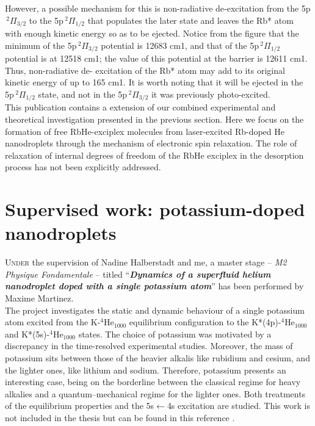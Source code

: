 		However, a possible mechanism for this is non-radiative de-excitation from the 5p$\,^2\Pi_{3/2}$ to the 5p$\,^2\Pi_{1/2}$ that populates the later state and leaves the Rb* atom with enough kinetic energy so as to be ejected. Notice from the figure that the minimum of the 5p$\,^2\Pi_{3/2}$ potential is 12683 cm1, and that of the 5p$\,^2\Pi_{1/2}$ potential is at 12518 cm1; the value of this potential at the barrier is 12611 cm1. Thus, non-radiative de- excitation of the Rb* atom may add to its original kinetic energy of up to 165 cm1. It is worth noting that it will be ejected in the 5p$\,^2\Pi_{1/2}$ state, and not in the 5p$\,^2\Pi_{3/2}$ it was previously photo-excited.\\
		
		This publication contains a extension of our combined experimental and theoretical investigation presented in the previous section. Here we focus on the formation of free RbHe-exciplex molecules from laser-excited Rb-doped He nanodroplets through the mechanism of electronic spin relaxation. The role of relaxation of internal degrees of freedom of the RbHe exciplex in the desorption process has not been explicitly addressed.
		
		
		\cleardoublepage
		
	\section{Supervised work: potassium-doped\\nanodroplets}
		\lettrine[lines=3,findent=3pt,nindent=0pt]{U}{nder} the supervision of Nadine Halberstadt and me, a master stage -- \emph{M2 Physique Fondamentale} -- titled ``\emph{\textbf{Dynamics of a superfluid helium nanodroplet doped with a single potassium atom}}'' has been performed by Maxime Martinez.\\
	
		The project investigates the static and dynamic behaviour of a single potassium atom excited from the K-$^4$He$_{1000}$ equilibrium configuration to the K*(4p)-$^4$He$_{1000}$ and K*(5s)-$^4$He$_{1000}$ states. The choice of potassium was motivated by a discrepancy in the time-resolved experimental studies\citep{Schulz2001,Reho2000-1,Reho2000-2}. Moreover, the mass of potassium sits between those of the heavier alkalis like rubidium and cesium, and the lighter ones, like lithium and sodium. Therefore, potassium presents an interesting case, being on the borderline between the classical regime for heavy alkalies and a quantum--mechanical regime for the lighter ones. Both treatments of the equilibrium properties and the 5s$\leftarrow$4s excitation are studied. This work is not included in the thesis but can be found in this reference \citep{Martinez2017}.
